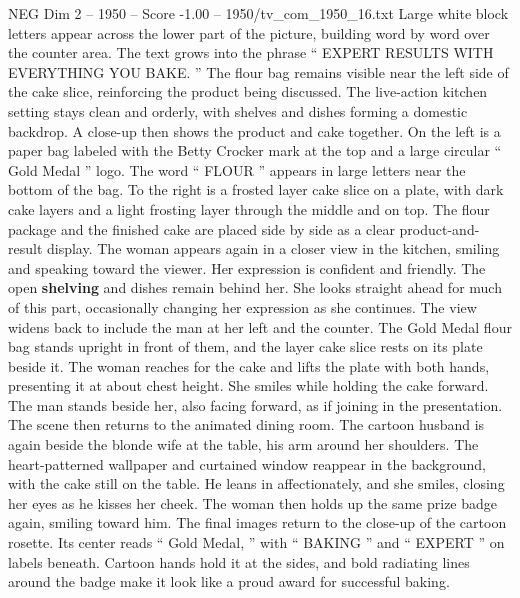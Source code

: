 \begin{textsample}{NEG Dim 2 – 1950 – Score -1.00 – 1950/tv\_com\_1950\_16.txt}
Large white block letters appear across the lower part of the picture, building word by word over the counter area.
The text grows into the phrase “ EXPERT RESULTS WITH EVERYTHING YOU BAKE. ” The flour bag remains visible near the left side of the cake slice, reinforcing the product being discussed.
The live-action kitchen setting stays clean and orderly, with shelves and dishes forming a domestic backdrop.
A close-up then shows the product and cake together.
On the left is a paper bag labeled with the Betty Crocker mark at the top and a large circular “ Gold Medal ” logo.
The word “ FLOUR ” appears in large letters near the bottom of the bag.
To the right is a frosted layer cake slice on a plate, with dark cake layers and a light frosting layer through the middle and on top.
The flour package and the finished cake are placed side by side as a clear product-and-result display.
The woman appears again in a closer view in the kitchen, smiling and speaking toward the viewer.
Her expression is confident and friendly.
The open \textbf{shelving} and dishes remain behind her.
She looks straight ahead for much of this part, occasionally changing her expression as she continues.
The view widens back to include the man at her left and the counter.
The Gold Medal flour bag stands upright in front of them, and the layer cake slice rests on its plate beside it.
The woman reaches for the cake and lifts the plate with both hands, presenting it at about chest height.
She smiles while holding the cake forward.
The man stands beside her, also facing forward, as if joining in the presentation.
The scene then returns to the animated dining room.
The cartoon husband is again beside the blonde wife at the table, his arm around her shoulders.
The heart-patterned wallpaper and curtained window reappear in the background, with the cake still on the table.
He leans in affectionately, and she smiles, closing her eyes as he kisses her cheek.
The woman then holds up the same prize badge again, smiling toward him.
The final images return to the close-up of the cartoon rosette.
Its center reads “ Gold Medal, ” with “ BAKING ” and “ EXPERT ” on labels beneath.
Cartoon hands hold it at the sides, and bold radiating lines around the badge make it look like a proud award for successful baking.

\end{textsample}
